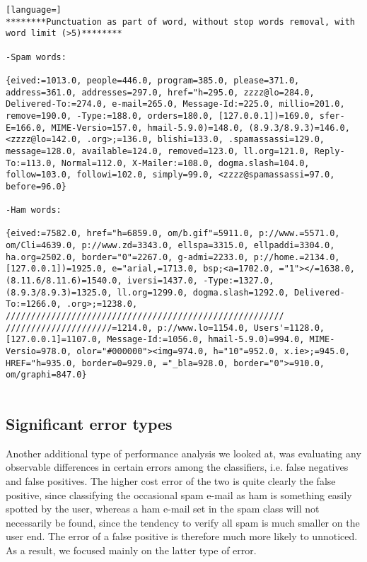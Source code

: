 \documentclass[12pt,a4paper]{report}
\begin{document}
\begin{lstlisting}[language=]
********Punctuation as part of word, without stop words removal, with word limit (>5)********

-Spam words:

{eived:=1013.0, people=446.0, program=385.0, please=371.0, address=361.0, addresses=297.0, href="h=295.0, zzzz@lo=284.0, Delivered-To:=274.0, e-mail=265.0, Message-Id:=225.0, millio=201.0, remove=190.0, -Type:=188.0, orders=180.0, [127.0.0.1])=169.0, sfer-E=166.0, MIME-Versio=157.0, hmail-5.9.0)=148.0, (8.9.3/8.9.3)=146.0, <zzzz@lo=142.0, .org>;=136.0, blishi=133.0, .spamassassi=129.0, message=128.0, available=124.0, removed=123.0, ll.org=121.0, Reply-To:=113.0, Normal=112.0, X-Mailer:=108.0, dogma.slash=104.0, follow=103.0, followi=102.0, simply=99.0, <zzzz@spamassassi=97.0, before=96.0}

-Ham words:

{eived:=7582.0, href="h=6859.0, om/b.gif"=5911.0, p://www.=5571.0, om/Cli=4639.0, p://www.zd=3343.0, ellspa=3315.0, ellpaddi=3304.0, ha.org=2502.0, border="0"=2267.0, g-admi=2233.0, p://home.=2134.0, [127.0.0.1])=1925.0, e="arial,=1713.0, bsp;<a=1702.0, ="1"></=1638.0, (8.11.6/8.11.6)=1540.0, iversi=1437.0, -Type:=1327.0, (8.9.3/8.9.3)=1325.0, ll.org=1299.0, dogma.slash=1292.0, Delivered-To:=1266.0, .org>;=1238.0, /////////////////////////////////////////////////////// /////////////////////=1214.0, p://www.lo=1154.0, Users'=1128.0, [127.0.0.1]=1107.0, Message-Id:=1056.0, hmail-5.9.0)=994.0, MIME-Versio=978.0, olor="#000000"><img=974.0, h="10"=952.0, x.ie>;=945.0, HREF="h=935.0, border=0=929.0, ="_bla=928.0, border="0">=910.0, om/graphi=847.0}


\end{lstlisting}

\subsection{Significant error types}
Another additional type of performance analysis we looked at, was evaluating any observable differences in certain errors among the classifiers, i.e. false negatives and false positives. The higher cost error of the two is quite clearly the false positive, since classifying the occasional spam e-mail as ham is something easily spotted by the user, whereas a ham e-mail set in the spam class will not necessarily be found, since the tendency to verify all spam is much smaller on the user end. The error of a false positive is therefore much more likely to unnoticed. As a result, we focused mainly on the latter type of error.
\end{document}
